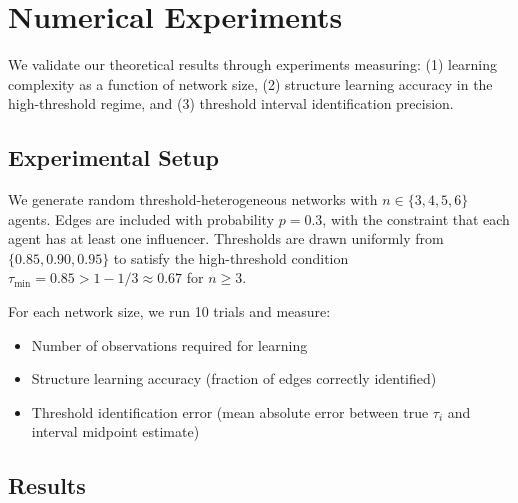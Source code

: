 \documentclass[conference]{IEEEtran}
\begin{document}
\section{Numerical Experiments}
\label{sec:experiments}

We validate our theoretical results through experiments measuring: (1) learning complexity as a function of network size, (2) structure learning accuracy in the high-threshold regime, and (3) threshold interval identification precision.

\subsection{Experimental Setup}

We generate random threshold-heterogeneous networks with $n \in \{3, 4, 5, 6\}$ agents. Edges are included with probability $p = 0.3$, with the constraint that each agent has at least one influencer. Thresholds are drawn uniformly from $\{0.85, 0.90, 0.95\}$ to satisfy the high-threshold condition $\tau_{\min} = 0.85 > 1 - 1/3 \approx 0.67$ for $n \geq 3$.

For each network size, we run 10 trials and measure:
\begin{itemize}
\item Number of observations required for learning
\item Structure learning accuracy (fraction of edges correctly identified)
\item Threshold identification error (mean absolute error between true $\tau_i$ and interval midpoint estimate)
\end{itemize}

\subsection{Results}
\end{document}
